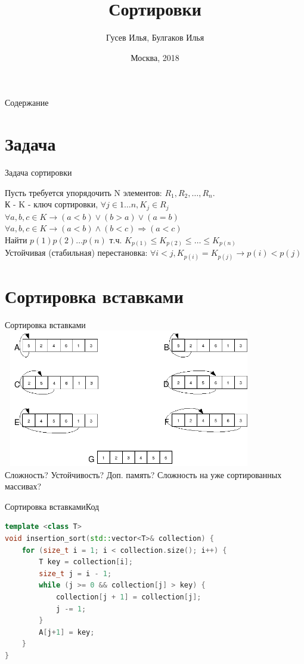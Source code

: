\documentclass[10pt]{beamer}
\title[\href{https://goo.gl/NRgp8K}{https://goo.gl/NRgp8K} (Term 1)]{Сортировки}
\author[Гусев Илья, Булгаков Илья]{Гусев Илья, Булгаков Илья}
\institute[МФТИ] 
{Московский физико-технический институт\\*}
\date{Москва, 2018}
\begin{document}
\begin{frame}
  \titlepage
\end{frame}

\begin{frame}{Содержание}
\tableofcontents
\end{frame}

\section{Задача}
\begin{frame}[fragile]{Задача сортировки}

Пусть требуется упорядочить N элементов: $R_{1},R_{2},\dots ,R_{n}$.\\
К - K - ключ сортировки, $\forall j \in 1\dots n, K_j \in R_j$\\
$\forall a, b, c \in K \rightarrow (a < b) \vee (b > a) \vee (a = b)$
$\forall a, b, c \in K \rightarrow (a < b) \wedge (b < c) \Rightarrow (a < c)$\\
Найти $p(1)p(2)\dots p(n)$ т.ч. $K_{p(1)}\leq K_{p(2)}\leq \dots \leq K_{p(n)}$\\
Устойчивая (стабильная) перестановка: $\forall i < j, K_{p(i)}=K_{p(j)} \rightarrow p(i)<p(j)$
\end{frame}

\section{Сортировка вставками}
\begin{frame}[fragile]{Сортировка вставками}
\includegraphics[width=11cm, height=6cm]{Term_1/Source/Pirctures/ins_sort.png}\\
Сложность? Устойчивость? Доп. память? Сложность на уже сортированных массивах? 
\end{frame}

\begin{frame}[fragile]{Сортировка вставками}{Код}
\begin{lstlisting}[language=C++]
template <class T>
void insertion_sort(std::vector<T>& collection) {
    for (size_t i = 1; i < collection.size(); i++) {
        T key = collection[i];
        size_t j = i - 1;
        while (j >= 0 && collection[j] > key) {
            collection[j + 1] = collection[j];
            j -= 1;
        }
        A[j+1] = key;
    }
}
\end{lstlisting}
\end{frame}
\end{document}
